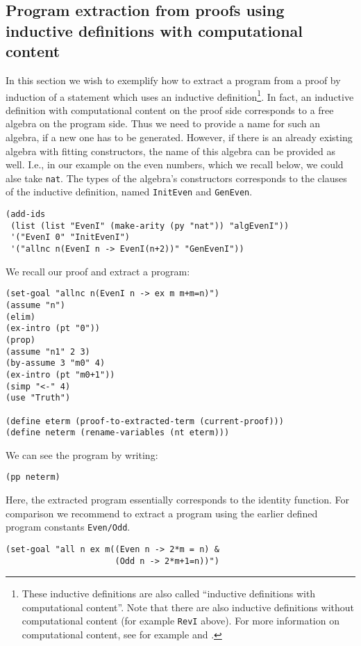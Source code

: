 \documentclass[12pt]{amsart}
\newcommand{\inquotes}[1]{``#1''}
\begin{document}
\subsection{Program extraction from proofs using inductive
  definitions with computational content} In this section we wish to
exemplify how to extract a program from a proof by induction of a
statement which uses an inductive definition\footnote{These inductive
  definitions are also called \inquotes{inductive definitions with
    computational content}. Note that there are also inductive
  definitions without computational content (for example \texttt{RevI}
  above).  For more information on computational content, see for
  example \cite{SchwichtenbergWainer12} and
  \cite{BergerSeisenberger10}.}.  In fact, an inductive definition
with computational content on the proof side corresponds to a free
algebra on the program side.  Thus we need to provide a name for such
an algebra, if a new one has to be generated.  However, if there is an
already existing algebra with fitting constructors, the name of this
algebra can be provided as well.  I.e., in our example on the even
numbers, which we recall below, we could alse take \texttt{nat}.  The
types of the algebra's constructors corresponds to the clauses of the
inductive definition, named \texttt{InitEven} and \texttt{GenEven}.
\begin{verbatim}
(add-ids
 (list (list "EvenI" (make-arity (py "nat")) "algEvenI"))
 '("EvenI 0" "InitEvenI")
 '("allnc n(EvenI n -> EvenI(n+2))" "GenEvenI"))
\end{verbatim}
We recall our proof and extract a program:
\begin{verbatim}
(set-goal "allnc n(EvenI n -> ex m m+m=n)")
(assume "n")
(elim)
(ex-intro (pt "0"))
(prop)
(assume "n1" 2 3)
(by-assume 3 "m0" 4)
(ex-intro (pt "m0+1"))
(simp "<-" 4)
(use "Truth")

(define eterm (proof-to-extracted-term (current-proof)))
(define neterm (rename-variables (nt eterm)))
\end{verbatim}
We can see the program by writing:
\begin{verbatim}
(pp neterm)
\end{verbatim}
Here, the extracted program essentially corresponds to the identity
function.  For comparison we recommend to extract a program using the
earlier defined program constants \verb|Even/Odd|.
\begin{verbatim}
(set-goal "all n ex m((Even n -> 2*m = n) &
                      (Odd n -> 2*m+1=n))")
\end{verbatim}
\end{document}
